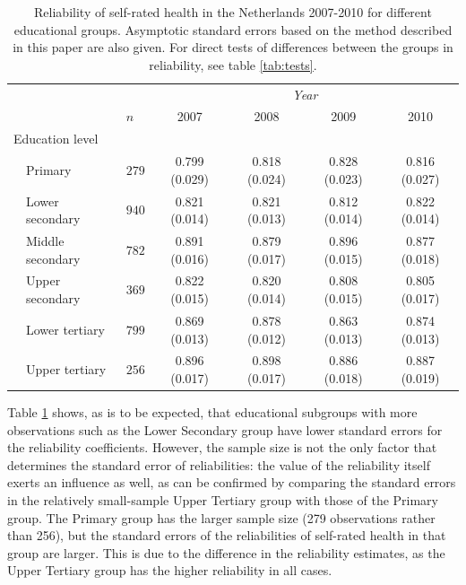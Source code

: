 \documentclass[a4paper, 11pt]{article}
\newcommand{\0}{\boldsymbol{0}}
\begin{document}
\begin{table}[tbh]
\begin{center}
\begin{tabular}{lllcccc}  \hline  \hline
&&&  \multicolumn{4}{c}{\emph{Year}}\\\cline{4-7}
&&$n$& 2007&2008&2009&2010\\
  \hline
  \multicolumn{2}{l}{Education level}\\
& Primary	   & $279$  & 0.799 (0.029) & 0.818 (0.024) & 0.828 (0.023) & 0.816 (0.027) \\ 
& Lower secondary  & $940$  & 0.821 (0.014) & 0.821 (0.013) & 0.812 (0.014) & 0.822 (0.014) \\ 
& Middle secondary & $782$  & 0.891 (0.016) & 0.879 (0.017) & 0.896 (0.015) & 0.877 (0.018) \\ 
& Upper secondary  & $369$  & 0.822 (0.015) & 0.820 (0.014) & 0.808 (0.015) & 0.805 (0.017) \\ 
& Lower tertiary   & $799$  & 0.869 (0.013) & 0.878 (0.012) & 0.863 (0.013) & 0.874 (0.013) \\ 
& Upper tertiary   & $256$  & 0.896 (0.017) & 0.898 (0.017) & 0.886 (0.018) & 0.887 (0.019) \\ 
  \hline     \hline
\end{tabular}
\caption{Reliability of self-rated health in the Netherlands 2007-2010 for different educational groups. 
Asymptotic standard errors based on the method described in this paper are also given. For direct tests of 
differences between the groups in reliability, see table \ref{tab:tests}.}\label{tab:health-education}
\end{center}
\end{table}

Table \ref{tab:health-education} shows, as is to be expected, that educational subgroups with more observations 
such as the Lower Secondary group have lower standard errors for the reliability coefficients. However, the sample size
is not the only factor that determines the standard error of reliabilities: the value of the reliability itself exerts an influence as well,
as can be confirmed by comparing the standard errors in the relatively small-sample Upper Tertiary group with those of the Primary group.
The Primary group has the larger sample size (279 observations rather than 256), but the standard errors of the reliabilities
of self-rated health in that group are larger. This is due to the difference in the reliability estimates, as the Upper Tertiary group 
has the higher reliability in all cases.
\end{document}
